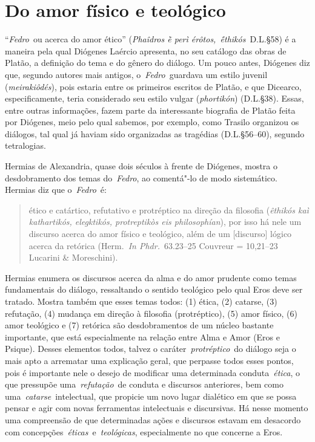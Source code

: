 



 \section{Do amor físico e
teológico}
 

``\emph{Fedro}~ou acerca do amor ético'' (\emph{Phaîdros ḕ perì
érôtos,~ḗthikós}~D.L.§58) é a maneira pela qual Diógenes Laércio
apresenta, no seu catálogo das obras de Platão, a definição do tema e do
gênero do diálogo. Um pouco antes, Diógenes diz que, segundo autores mais
antigos, o~\emph{Fedro}~guardava um estilo juvenil (\emph{meirakiôdés}),
pois estaria entre os primeiros escritos de Platão, e que Dicearco,
especificamente, teria considerado seu estilo vulgar (\emph{phortikón})
(D.L.§38). Essas, entre outras informações, fazem parte da interessante
biografia de Platão feita por Diógenes, meio pelo qual sabemos, por
exemplo, como Trasilo organizou os diálogos, tal qual já haviam sido
organizadas as tragédias (D.L.§56--60), segundo tetralogias.

Hermias de Alexandria, quase dois séculos à frente de Diógenes, mostra o
desdobramento dos temas do~\emph{Fedro}, ao comentá"-lo de modo
sistemático. Hermias diz que o~\emph{Fedro}~é:

 

\begin{quote}
\redondo{[…]} ético e catártico, refutativo e protréptico na direção da
filosofia (\emph{êthikós kaì kathartikós, elegktikós, protreptikòs eis
philosophían}), por isso há nele um discurso acerca do amor físico e
teológico, além de um [discurso] lógico acerca da retórica
(Herm.~\emph{In Phdr.}~63.23--25 Couvreur = 10,21--23 Lucarini \&
Moreschini).
\end{quote}

 

Hermias enumera os discursos acerca da alma e do amor prudente como
temas fundamentais do diálogo, ressaltando o sentido teológico pelo qual
Eros deve ser tratado. Mostra também que esses temas todos: (1) ética,
(2) catarse, (3) refutação, (4) mudança em direção à filosofia
(protréptico), (5) amor físico, (6) amor teológico e (7) retórica são
desdobramentos de um núcleo bastante importante, que está especialmente
na relação entre Alma e Amor (Eros e Psique). Desses elementos todos,
talvez o caráter~\emph{protréptico}~do diálogo seja o mais apto a
arrematar uma explicação geral, que perpasse todos esses pontos, pois é
importante nele o desejo de modificar uma determinada
conduta~\emph{ética}, o que pressupõe uma~\emph{refutação}~de conduta e
discursos anteriores, bem como uma~\emph{catarse}~intelectual, que
propicie um novo lugar dialético em que se possa pensar e agir com novas
ferramentas intelectuais e discursivas. Há nesse momento uma compreensão
de que determinadas ações e discursos estavam em desacordo com
concepções~\emph{éticas}~e~\emph{teológicas}, especialmente no que
concerne a Eros.


